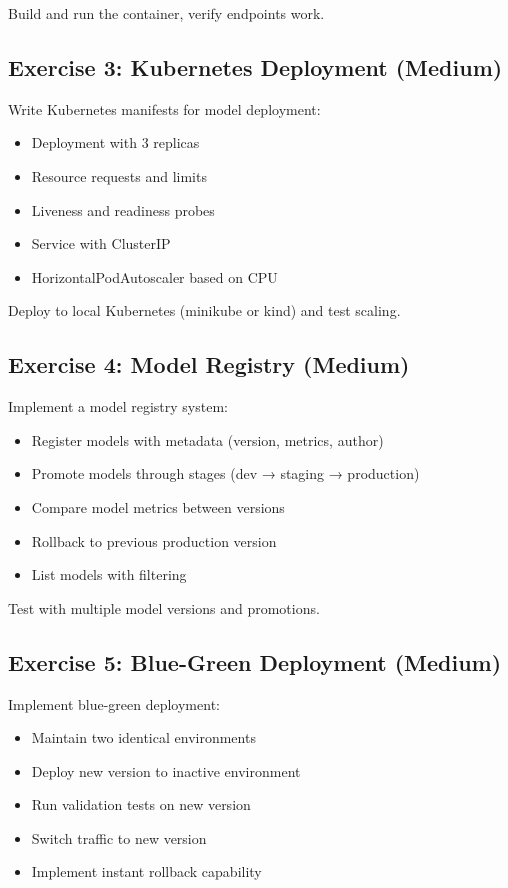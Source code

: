 Build and run the container, verify endpoints work.

\subsection{Exercise 3: Kubernetes Deployment (Medium)}

Write Kubernetes manifests for model deployment:
\begin{itemize}
    \item Deployment with 3 replicas
    \item Resource requests and limits
    \item Liveness and readiness probes
    \item Service with ClusterIP
    \item HorizontalPodAutoscaler based on CPU
\end{itemize}

Deploy to local Kubernetes (minikube or kind) and test scaling.

\subsection{Exercise 4: Model Registry (Medium)}

Implement a model registry system:
\begin{itemize}
    \item Register models with metadata (version, metrics, author)
    \item Promote models through stages (dev → staging → production)
    \item Compare model metrics between versions
    \item Rollback to previous production version
    \item List models with filtering
\end{itemize}

Test with multiple model versions and promotions.

\subsection{Exercise 5: Blue-Green Deployment (Medium)}

Implement blue-green deployment:
\begin{itemize}
    \item Maintain two identical environments
    \item Deploy new version to inactive environment
    \item Run validation tests on new version
    \item Switch traffic to new version
    \item Implement instant rollback capability
\end{itemize}

